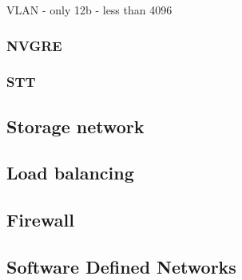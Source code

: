 VLAN - only 12b - less than 4096

\subsubsection{NVGRE}
\subsubsection{STT}

\subsection{Storage network}

\subsection{Load balancing}

\subsection{Firewall}

\subsection{Software Defined Networks}
